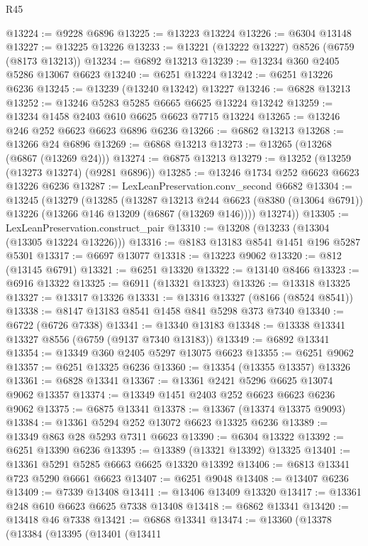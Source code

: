 \begin{lexlean}{R45}
\begin{coremodule}
{@13224 := @9228 @6896
@13225 := @13223 @13224
@13226 := @6304 @13148
@13227 := @13225 @13226
@13233 := @13221 (@13222 @13227) @8526 (@6759 (@8173 @13213))
@13234 := @6892 @13213
@13239 := @13234 @360 @2405 @5286 @13067 @6623
@13240 := @6251 @13224
@13242 := @6251 @13226 @6236
@13245 := @13239 (@13240 @13242) @13227
@13246 := @6828 @13213
@13252 := @13246 @5283 @5285 @6665 @6625 @13224 @13242
@13259 := @13234 @1458 @2403 @610 @6625 @6623 @7715 @13224
@13265 := @13246 @246 @252 @6623 @6623 @6896 @6236
@13266 := @6862 @13213
@13268 := @13266 @24 @6896
@13269 := @6868 @13213
@13273 := @13265 (@13268 (@6867 (@13269 @24)))
@13274 := @6875 @13213
@13279 := @13252 (@13259 (@13273 @13274) (@9281 @6896))
@13285 := @13246 @1734 @252 @6623 @6623 @13226 @6236
@13287 := LexLeanPreservation.conv_second @6682
@13304 := @13245
    (@13279
      (@13285
        (@13287
          @13213
          @244
          @6623
          (@8380 (@13064 @6791))
          @13226
          (@13266 @146 @13209 (@6867 (@13269 @146))))
        @13274))
@13305 := LexLeanPreservation.construct_pair
@13310 := @13208 (@13233 (@13304 (@13305 @13224 @13226)))
@13316 := @8183 @13183 @8541 @1451 @196 @5287 @5301
@13317 := @6697 @13077
@13318 := @13223 @9062
@13320 := @812 (@13145 @6791)
@13321 := @6251 @13320
@13322 := @13140 @8466
@13323 := @6916 @13322
@13325 := @6911 (@13321 @13323)
@13326 := @13318 @13325
@13327 := @13317 @13326
@13331 := @13316 @13327 (@8166 (@8524 @8541))
@13338 := @8147 @13183 @8541 @1458 @841 @5298 @373 @7340
@13340 := @6722 (@6726 @7338)
@13341 := @13340 @13183
@13348 := @13338 @13341 @13327 @8556 (@6759 (@9137 @7340 @13183))
@13349 := @6892 @13341
@13354 := @13349 @360 @2405 @5297 @13075 @6623
@13355 := @6251 @9062
@13357 := @6251 @13325 @6236
@13360 := @13354 (@13355 @13357) @13326
@13361 := @6828 @13341
@13367 := @13361 @2421 @5296 @6625 @13074 @9062 @13357
@13374 := @13349 @1451 @2403 @252 @6623 @6623 @6236 @9062
@13375 := @6875 @13341
@13378 := @13367 (@13374 @13375 @9093)
@13384 := @13361 @5294 @252 @13072 @6623 @13325 @6236
@13389 := @13349 @863 @28 @5293 @7311 @6623
@13390 := @6304 @13322
@13392 := @6251 @13390 @6236
@13395 := @13389 (@13321 @13392) @13325
@13401 := @13361 @5291 @5285 @6663 @6625 @13320 @13392
@13406 := @6813 @13341 @723 @5290 @6661 @6623
@13407 := @6251 @9048
@13408 := @13407 @6236
@13409 := @7339 @13408
@13411 := @13406 @13409 @13320
@13417 := @13361 @248 @610 @6623 @6625 @7338 @13408
@13418 := @6862 @13341
@13420 := @13418 @46 @7338
@13421 := @6868 @13341
@13474 := @13360
    (@13378
      (@13384
        (@13395
          (@13401
            (@13411
}
\end{coremodule}
\end{lexlean}
